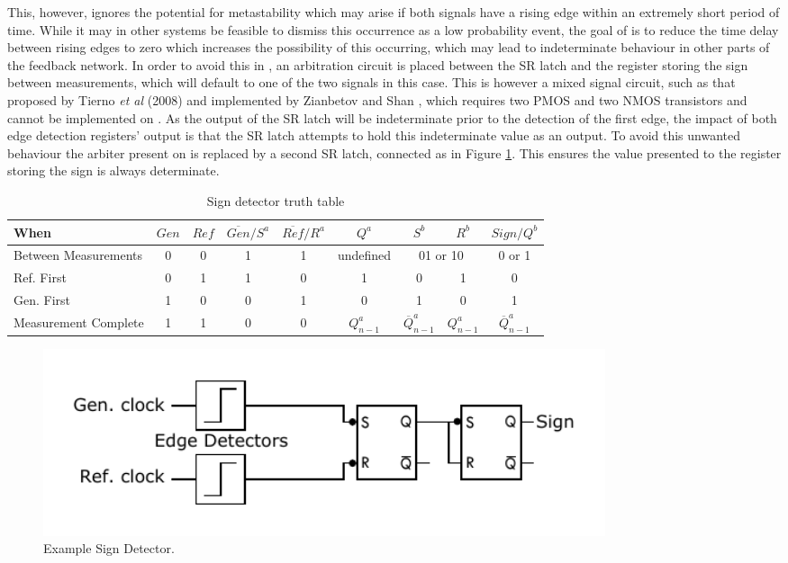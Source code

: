 This, however, ignores the potential for metastability which may arise if both signals have a rising edge within an extremely short period of time. While it may in other systems be feasible to dismiss this occurrence as a low probability event, the goal of  is to reduce the time delay between rising edges to zero which increases the possibility of this occurring, which may lead to indeterminate behaviour in other parts of the feedback network. In order to avoid this in , an arbitration circuit is placed between the \ac{SR} latch and the register storing the sign between measurements, which will default to one of the two signals in this case. This is however a mixed signal circuit, such as that proposed by Tierno \textit{et al} (2008) and implemented by Zianbetov and Shan \cite{tierno2008wide,zianbetov2013phd,shan2014phd}, which requires two \ac{PMOS} and two \ac{NMOS} transistors and cannot be implemented on . As the output of the \ac{SR} latch will be indeterminate prior to the detection of the first edge, the impact of both edge detection registers' output is that the \ac{SR} latch attempts to hold this indeterminate value as an output. To avoid this unwanted behaviour the arbiter present on  is replaced by a second \ac{SR} latch, connected as in Figure \ref{fig:arbitration}. This ensures the value presented to the register storing the sign is always determinate.
\begin{table}[!ht]
	\begin{center}
		\setlength{\tabcolsep}{.5\tabcolsep}
		\begin{tabular}{l|cc|cc|c|cc|c}           
			When&$Gen$&$Ref$&$\overline{Gen}/S^a$&$\overline{Ref}/R^a$&$Q^a$&$S^b$&$R^b$&$Sign/Q^b$\\
			\hline
			Between Measurements&0&0&1&1&\multicolumn{1}{c|}{undefined}&\multicolumn{2}{c|}{01 or 10}&\multicolumn{1}{c}{0 or 1}\T\\
			Ref. First&0&1&1&0&1&0&1&0\T\\
			Gen. First&1&0&0&1&0&1&0&1\T\\	
			Measurement Complete&1&1&0&0&$Q^a_{n-1}$&$\overline{Q}^a_{n-1}$&$Q^a_{n-1}$&$\overline{Q}^a_{n-1}$\T\\					
		\end{tabular}
		\caption{Sign detector truth table}
		\label{table:sign_tt}
	\end{center}
\end{table}
\begin{figure}[h]
	\centering
	\includegraphics[width=0.8\textwidth]{../simple_sign_detection}
	\caption[Example Sign Detector]{Example Sign Detector.}
	\label{fig:arbitration}
\end{figure}

